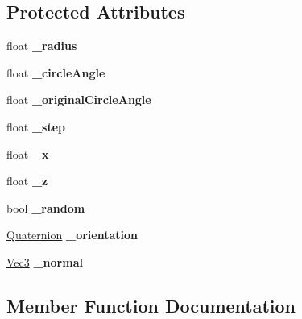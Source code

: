 \subsection*{Protected Attributes}
\begin{DoxyCompactItemize}
\item 
\mbox{\label{classPUCircleEmitter_af3a038a445e5f253ba41f936167b22d9}} 
float {\bfseries \+\_\+radius}
\item 
\mbox{\label{classPUCircleEmitter_a2a30262b5178d8073cc9dd9ebf421332}} 
float {\bfseries \+\_\+circle\+Angle}
\item 
\mbox{\label{classPUCircleEmitter_a7f32b75908f0b3aed20a3965e64d0ee8}} 
float {\bfseries \+\_\+original\+Circle\+Angle}
\item 
\mbox{\label{classPUCircleEmitter_adcd5aca86d0f947a5f7e3f34d708a9d7}} 
float {\bfseries \+\_\+step}
\item 
\mbox{\label{classPUCircleEmitter_a4ef2c707b1ff0d59213f18502507faf0}} 
float {\bfseries \+\_\+x}
\item 
\mbox{\label{classPUCircleEmitter_a44fdab40efd3380566385098089235ea}} 
float {\bfseries \+\_\+z}
\item 
\mbox{\label{classPUCircleEmitter_ab482acab28a8b268624862ec409feed2}} 
bool {\bfseries \+\_\+random}
\item 
\mbox{\label{classPUCircleEmitter_abfff5a4666c5a8b1f5d4483c80deec68}} 
\hyperlink{classQuaternion}{Quaternion} {\bfseries \+\_\+orientation}
\item 
\mbox{\label{classPUCircleEmitter_a43e5e87eb4f5023d5b08c71727cf096d}} 
\hyperlink{classVec3}{Vec3} {\bfseries \+\_\+normal}
\end{DoxyCompactItemize}


\subsection{Member Function Documentation}
\mbox{\label{classPUCircleEmitter_aaf9f5cd827deabac2b6f9e5417483403}} 
